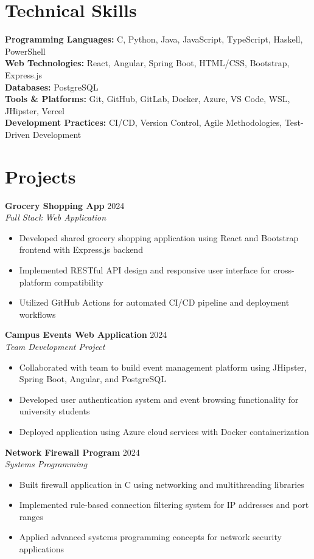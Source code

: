 \documentclass[11pt,a4paper]{article}
\newcommand{\cvproject}[4]{
    \textbf{#1} \hfill #2 \\
    \textit{#3} \\
    #4
    \vspace{8pt}
}
\begin{document}
\section{Technical Skills}

\textbf{Programming Languages:} C, Python, Java, JavaScript, TypeScript, Haskell, PowerShell \\
\textbf{Web Technologies:} React, Angular, Spring Boot, HTML/CSS, Bootstrap, Express.js \\
\textbf{Databases:} PostgreSQL \\
\textbf{Tools \& Platforms:} Git, GitHub, GitLab, Docker, Azure, VS Code, WSL, JHipster, Vercel \\
\textbf{Development Practices:} CI/CD, Version Control, Agile Methodologies, Test-Driven Development

\section{Projects}

\cvproject{Grocery Shopping App}{2024}{Full Stack Web Application}{
    \begin{itemize}[leftmargin=20pt, noitemsep, topsep=0pt]
        \item Developed shared grocery shopping application using React and Bootstrap frontend with Express.js backend
        \item Implemented RESTful API design and responsive user interface for cross-platform compatibility
        \item Utilized GitHub Actions for automated CI/CD pipeline and deployment workflows
    \end{itemize}
}

\cvproject{Campus Events Web Application}{2024}{Team Development Project}{
    \begin{itemize}[leftmargin=20pt, noitemsep, topsep=0pt]
        \item Collaborated with team to build event management platform using JHipster, Spring Boot, Angular, and PostgreSQL
        \item Developed user authentication system and event browsing functionality for university students
        \item Deployed application using Azure cloud services with Docker containerization
    \end{itemize}
}

\cvproject{Network Firewall Program}{2024}{Systems Programming}{
    \begin{itemize}[leftmargin=20pt, noitemsep, topsep=0pt]
        \item Built firewall application in C using networking and multithreading libraries
        \item Implemented rule-based connection filtering system for IP addresses and port ranges
        \item Applied advanced systems programming concepts for network security applications
    \end{itemize}
}
\end{document}
